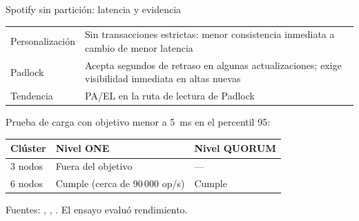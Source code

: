 \begin{frame}{Spotify sin partición: latencia y evidencia}
  \small
  \renewcommand{\arraystretch}{1.3}
  \begin{tabular}{p{} p{}}
    \toprule
    Personalización & Sin transacciones estrictas: menor consistencia
      inmediata a cambio de menor latencia \\
    Padlock & Acepta segundos de retraso en algunas actualizaciones;
      exige visibilidad inmediata en altas nuevas \\
    Tendencia & PA/EL en la ruta de lectura de Padlock \\
    \bottomrule
  \end{tabular}

  \bigskip
  Prueba de carga con objetivo menor a 5~ms en el percentil 95:

  \medskip
  \centering
  \renewcommand{\arraystretch}{1.3}
  \begin{tabular}{lll}
    \toprule
    \textbf{Clúster} & \textbf{Nivel ONE} & \textbf{Nivel QUORUM} \\
    \midrule
    3 nodos & Fuera del objetivo & --- \\
    6 nodos & Cumple (cerca de 90\,000 op/s) & Cumple \\
    \bottomrule
  \end{tabular}

  \vfill
  \raggedright
  \footnotesize Fuentes: \cite{mishra2015personalization},
  \cite{leenders2018padlock}, \cite{cody2015cassandra}. El ensayo evaluó
  rendimiento.
\end{frame}
